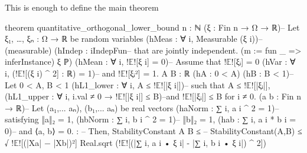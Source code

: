 \documentclass[11pt]{amsart}
\numberwithin{equation}{section}
\theoremstyle{definition}
\theoremstyle{remark}
\begin{document}
This is enough to define the main theorem
\begin{leancode}
theorem quantitative_orthogonal_lower_bound
    {n : ℕ}
    (ξ : Fin n → Ω → ℝ)--                        Let ξ₁, …, ξₙ : Ω → ℝ be random variables
    (hMeas : ∀ i, Measurable (ξ i))--            (measurable)
    (hIndep : iIndepFun--                        that are jointly independent.
      (m := fun _ => inferInstance) ξ ℙ)
    (hMean : ∀ i, !$\mathbb E$![ξ i] = 0)--                  Assume that !$\mathbb E$![ξᵢ] = 0
    (hVar : ∀ i, (!$\mathbb E$![(ξ i) ^ 2] : ℝ) = 1)--       and !$\mathbb E$![ξᵢ²] = 1.
    {A B : ℝ} (hA : 0 < A) (hB : B < 1)--        Let 0 < A, B < 1
    (hL1_lower : ∀ i, A ≤ !$\mathbb E$![|ξ i|])--            such that A ≤ !$\mathbb E$![|ξᵢ|],
    (hL1_upper : ∀ i, i.val ≠ 0 → !$\mathbb E$![|ξ i|] ≤ B)--and !$\mathbb E$![|ξᵢ|] ≤ B for i ≠ 0.
    (a b : Fin n → ℝ)--                          Let (a₁,... aₙ), (b₁,... aₙ) be real vectors
    (haNorm : ∑ i, a i ^ 2 = 1)--                satisfying ‖a‖₂ = 1,
    (hbNorm : ∑ i, b i ^ 2 = 1)--                ‖b‖₂ = 1,
    (hab : ∑ i, a i * b i = 0)--                 and ⟨a, b⟩ = 0.
    : --                                         Then,
    StabilityConstant A B ≤ --                   StabilityConstant(A,B) ≤ √ !$\mathbb E$![(|Xa| − |Xb|)²]
      Real.sqrt (!$\mathbb E$![(|∑ i, a i • ξ i| - |∑ i, b i • ξ i|) ^ 2])
\end{leancode}
\end{document}
